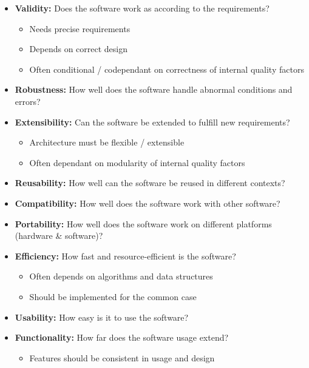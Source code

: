 \documentclass[
../../Software_Engineering_Summary.tex,
]
{subfiles}
\begin{document}
\begin{defbox}
    \begin{itemize}
        \item \textbf{Validity:} Does the software work as according to the requirements?
        \begin{itemize}
            \item Needs precise requirements
            \item Depends on correct design
            \item Often conditional / codependant on correctness of internal quality factors
        \end{itemize}
        \item \textbf{Robustness:} How well does the software handle abnormal conditions and errors?
        \item \textbf{Extensibility:} Can the software be extended to fulfill new requirements?
        \begin{itemize}
            \item Architecture must be flexible / extensible
            \item Often dependant on modularity of internal quality factors
        \end{itemize}
        \item \textbf{Reusability:} How well can the software be reused in different contexts?
        \item \textbf{Compatibility:} How well does the software work with other software?
        \item \textbf{Portability:} How well does the software work on different platforms (hardware \& software)?
        \item \textbf{Efficiency:} How fast and resource-efficient is the software?
        \begin{itemize}
            \item Often depends on algorithms and data structures
            \item Should be implemented for the common case
        \end{itemize}
        \item \textbf{Usability:} How easy is it to use the software?
        \item \textbf{Functionality:} How far does the software usage extend?
        \begin{itemize}
            \item Features should be consistent in usage and design
        \end{itemize}
    \end{itemize}
\end{defbox}
\end{document}
